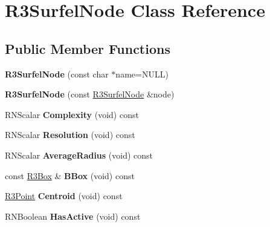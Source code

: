 \hypertarget{class_r3_surfel_node}{}\section{R3\+Surfel\+Node Class Reference}
\label{class_r3_surfel_node}
\subsection*{Public Member Functions}
\begin{DoxyCompactItemize}
\item 
{\bfseries R3\+Surfel\+Node} (const char $\ast$name=N\+U\+LL)\hypertarget{class_r3_surfel_node_a9b8980d35302d714e54a9781a91213cd}{}\label{class_r3_surfel_node_a9b8980d35302d714e54a9781a91213cd}

\item 
{\bfseries R3\+Surfel\+Node} (const \hyperlink{class_r3_surfel_node}{R3\+Surfel\+Node} \&node)\hypertarget{class_r3_surfel_node_a23c025b263d30124fa5559932de6dca1}{}\label{class_r3_surfel_node_a23c025b263d30124fa5559932de6dca1}

\item 
R\+N\+Scalar {\bfseries Complexity} (void) const \hypertarget{class_r3_surfel_node_a1134c841f459e681b96238ce18221ace}{}\label{class_r3_surfel_node_a1134c841f459e681b96238ce18221ace}

\item 
R\+N\+Scalar {\bfseries Resolution} (void) const \hypertarget{class_r3_surfel_node_a20a65fc2c069c097bb93b36f1df82736}{}\label{class_r3_surfel_node_a20a65fc2c069c097bb93b36f1df82736}

\item 
R\+N\+Scalar {\bfseries Average\+Radius} (void) const \hypertarget{class_r3_surfel_node_a2980cc8915c18b36bfe1630627e2cb94}{}\label{class_r3_surfel_node_a2980cc8915c18b36bfe1630627e2cb94}

\item 
const \hyperlink{class_r3_box}{R3\+Box} \& {\bfseries B\+Box} (void) const \hypertarget{class_r3_surfel_node_a968b610104734e16cea37904df104367}{}\label{class_r3_surfel_node_a968b610104734e16cea37904df104367}

\item 
\hyperlink{class_r3_point}{R3\+Point} {\bfseries Centroid} (void) const \hypertarget{class_r3_surfel_node_acdee894bbcfc00d3fc071ff698162e13}{}\label{class_r3_surfel_node_acdee894bbcfc00d3fc071ff698162e13}

\item 
R\+N\+Boolean {\bfseries Has\+Active} (void) const \hypertarget{class_r3_surfel_node_a2e514321e41f0c0b86de1abf517e21d0}{}\label{class_r3_surfel_node_a2e514321e41f0c0b86de1abf517e21d0}


\end{DoxyCompactItemize}
